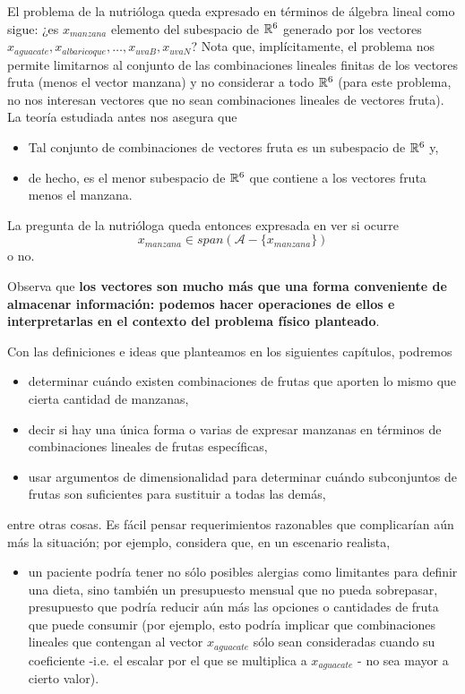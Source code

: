El problema de la nutrióloga queda expresado en términos
de álgebra lineal como sigue:
¿es $x_{manzana}$ elemento del subespacio de $\mathbb{R}^{6}$ generado
por los vectores $x_{aguacate}, x_{albaricoque}, \ldots ,
x_{uvaB}, x_{uvaN}$? Nota que, implícitamente,
el problema nos permite limitarnos al conjunto de
las combinaciones lineales finitas de los vectores fruta
(menos el vector manzana) y no considerar a todo $\mathbb{R}^{6}$
(para este problema, no nos interesan vectores que no sean combinaciones
lineales de vectores fruta). La teoría estudiada antes nos asegura que
\begin{itemize}
	\item Tal conjunto de combinaciones de vectores fruta
	es un subespacio de $\mathbb{R}^{6}$ y,
	\item de hecho, es el menor subespacio de $\mathbb{R}^{6}$ que contiene 
	a los vectores fruta menos el manzana.
\end{itemize}

La pregunta de la nutrióloga queda entonces expresada en ver si ocurre
\[
x_{manzana} \in span ( \mathcal{A} - \{ x_{manzana} \} )
\]
o no.

Observa que \textbf{los vectores son mucho más que una forma conveniente de 
almacenar información: podemos hacer operaciones de ellos e
interpretarlas en el contexto del 
problema físico planteado}.

Con las definiciones e ideas que planteamos en los siguientes capítulos,
podremos 
\begin{itemize}
	\item determinar cuándo existen combinaciones de frutas
	que aporten lo mismo que cierta cantidad de manzanas,
	\item decir si hay una única forma o varias de expresar manzanas
	en términos de combinaciones lineales de frutas específicas,
	\item usar argumentos de dimensionalidad para determinar
	cuándo subconjuntos de frutas son suficientes para
	sustituir a todas las demás,
\end{itemize}
entre otras cosas.
Es fácil pensar requerimientos razonables
que complicarían aún más la situación; por ejemplo, considera que,
en un escenario realista, 
\begin{itemize}
	\item un paciente podría tener no sólo posibles alergias
	como limitantes para definir una dieta, sino también 
	un presupuesto mensual que no pueda sobrepasar, presupuesto
	que podría reducir aún más las opciones o cantidades
	de fruta que puede consumir (por ejemplo, esto podría implicar
	que combinaciones lineales que contengan al vector
	$x_{aguacate}$ sólo sean consideradas cuando su coeficiente
	-i.e. el escalar por el que se multiplica a $x_{aguacate}$ - 
	no sea mayor a cierto valor).
\end{itemize}



